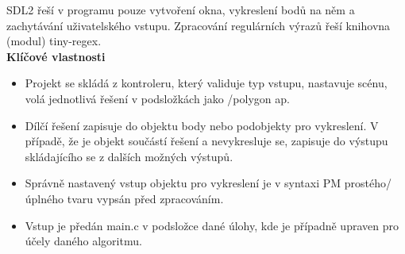 \documentclass[a4paper,12pt]{book}
\begin{document}
 SDL2 řeší v programu pouze vytvoření okna, vykreslení bodů na něm a zachytávání uživatelského vstupu. Zpracování regulárních výrazů řeší knihovna (modul) tiny-regex.
\\
 
\textbf{Klíčové vlastnosti}

 \begin{itemize}
  \item Projekt se skládá z kontroleru, který validuje typ vstupu, nastavuje scénu, volá jednotlivá řešení v podsložkách jako /polygon ap.
  \item Dílčí řešení zapisuje do objektu body nebo podobjekty pro vykreslení. V případě, že je objekt součástí řešení a nevykresluje se, zapisuje do výstupu skládajícího se z dalších možných výstupů.
  \item Správně nastavený vstup objektu pro vykreslení je v syntaxi PM prostého/úplného tvaru vypsán před zpracováním.
  \item Vstup je předán main.c v podsložce dané úlohy, kde je případně upraven pro účely daného algoritmu.
\end{itemize}
\end{document}

